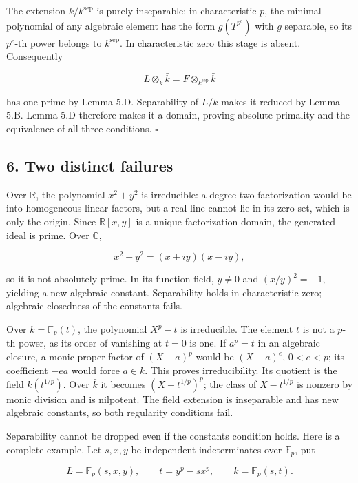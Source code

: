 \documentclass[
]{article}
\begin{document}
The extension \(\bar k/k^{\mathrm{sep}}\) is purely inseparable: in
characteristic \(p\), the minimal polynomial of any algebraic element
has the form \(g(T^{p^e})\) with \(g\) separable, so its \(p^e\)-th
power belongs to \(k^{\mathrm{sep}}\). In characteristic zero this stage
is absent. Consequently

\[
L\otimes_k\bar k=F\otimes_{k^{\mathrm{sep}}}\bar k
\]

has one prime by Lemma 5.D. Separability of \(L/k\) makes it reduced by
Lemma 5.B. Lemma 5.D therefore makes it a domain, proving absolute
primality and the equivalence of all three conditions. \(\square\)

\subsection{6. Two distinct failures}\label{two-distinct-failures}

Over \(\mathbb R\), the polynomial \(x^2+y^2\) is irreducible: a
degree-two factorization would be into homogeneous linear factors, but a
real line cannot lie in its zero set, which is only the origin. Since
\(\mathbb R[x,y]\) is a unique factorization domain, the generated ideal
is prime. Over \(\mathbb C\),

\[
x^2+y^2=(x+iy)(x-iy),
\]

so it is not absolutely prime. In its function field, \(y\ne0\) and
\((x/y)^2=-1\), yielding a new algebraic constant. Separability holds in
characteristic zero; algebraic closedness of the constants fails.

Over \(k=\mathbb F_p(t)\), the polynomial \(X^p-t\) is irreducible. The
element \(t\) is not a \(p\)-th power, as its order of vanishing at
\(t=0\) is one. If \(a^p=t\) in an algebraic closure, a monic proper
factor of \((X-a)^p\) would be \((X-a)^e\), \(0<e<p\); its coefficient
\(-ea\) would force \(a\in k\). This proves irreducibility. Its quotient
is the field \(k(t^{1/p})\). Over \(\bar k\) it becomes
\((X-t^{1/p})^p\); the class of \(X-t^{1/p}\) is nonzero by monic
division and is nilpotent. The field extension is inseparable and has
new algebraic constants, so both regularity conditions fail.

Separability cannot be dropped even if the constants condition holds.
Here is a complete example. Let \(s,x,y\) be independent indeterminates
over \(\mathbb F_p\), put

\[
L=\mathbb F_p(s,x,y),\qquad t=y^p-sx^p,\qquad k=\mathbb F_p(s,t).
\tag{6.1}
\]
\end{document}
